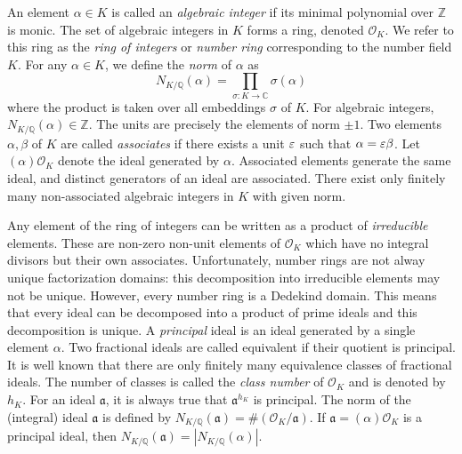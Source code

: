 An element $\alpha \in K$ is called an \textit{algebraic integer} if its minimal polynomial over $\mathbb{Z}$ is monic. The set of algebraic integers in $K$ forms a ring, denoted $\mathcal{O}_K$. We refer to this ring as the \textit{ring of integers} or \textit{number ring} corresponding to the number field $K$. For any $\alpha \in K$, we define the \textit{norm} of $\alpha$ as 
\[N_{K/\mathbb{Q}}(\alpha) = \prod_{\sigma:K \to \mathbb{C}} \sigma(\alpha)\]
where the product is taken over all embeddings $\sigma$ of $K$. For algebraic integers, $N_{K/\mathbb{Q}}(\alpha) \in \mathbb{Z}$. The units are precisely the elements of norm $\pm 1$. Two elements $\alpha, \beta$ of $K$ are called \textit{associates} if there exists a unit $\varepsilon$ such that $\alpha = \varepsilon \beta$. Let $(\alpha)\mathcal{O}_K$ denote the ideal generated by $\alpha$. Associated elements generate the same ideal, and distinct generators of an ideal are associated. There exist only finitely many non-associated algebraic integers in $K$ with given norm. 

Any element of the ring of integers can be written as a product of \textit{irreducible} elements. These are non-zero non-unit elements of $\mathcal{O}_K$ which have no integral divisors but their own associates. Unfortunately, number rings are not alway unique factorization domains: this decomposition into irreducible elements may not be unique. However, every number ring is a Dedekind domain. This means that every ideal can be decomposed into a product of prime ideals and this decomposition is unique. A \textit{principal} ideal is an ideal generated by a single element $\alpha$. Two fractional ideals are called equivalent if their quotient is principal. It is well known that there are only finitely many equivalence classes of fractional ideals.  The number of classes is called the \textit{class number} of $\mathcal{O}_K$ and is denoted by $h_K$. For an ideal $\mathfrak{a}$, it is always true that $\mathfrak{a}^{h_K}$ is principal. The norm of the (integral) ideal $\mathfrak{a}$ is defined by $N_{K/\mathbb{Q}}(\mathfrak{a}) = \#\left(\mathcal{O}_K/\mathfrak{a}\right)$. If $\mathfrak{a} = (\alpha) \mathcal{O}_K$ is a principal ideal, then $N_{K/\mathbb{Q}}(\mathfrak{a}) = \left|N_{K/\mathbb{Q}}(\alpha)\right|$. 

